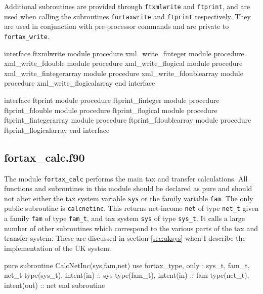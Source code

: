\documentclass[11pt,thmsa,letter,ukenglish]{article}
\begin{document}
\noindent Additional subroutines are provided through \texttt{ftxmlwrite} and \texttt{ftprint}, and are used when calling the subroutines \texttt{fortaxwrite} and \texttt{ftprint} respectively. They are used in conjunction with pre-processor commands and are private to \texttt{fortax\_write}.

\begin{fortrancode}
interface ftxmlwrite
    module procedure xml_write_finteger
    module procedure xml_write_fdouble
    module procedure xml_write_flogical
    module procedure xml_write_fintegerarray
    module procedure xml_write_fdoublearray
    module procedure xml_write_flogicalarray
end interface
\end{fortrancode}

\begin{fortrancode}
interface ftprint
    module procedure ftprint_finteger
    module procedure ftprint_fdouble
    module procedure ftprint_flogical
    module procedure ftprint_fintegerarray
    module procedure ftprint_fdoublearray
    module procedure ftprint_flogicalarray
end interface
\end{fortrancode}

\subsection{fortax\_calc.f90}\label{sec:fortaxcalc}

The module \texttt{fortax\_calc} performs the main tax and transfer calculations. All functions and subroutines in this module should be declared as pure and should not alter either the tax system variable \texttt{sys} or the family variable \texttt{fam}. The only public subroutine is \texttt{calcnetinc}. This returns net-income \texttt{net} of type \texttt{net\_t} given a family \texttt{fam} of type \texttt{fam\_t}, and tax system \texttt{sys} of type \texttt{sys\_t}. It calls a large number of other subroutines which correspond to the various parts of the tax and transfer system. These are discussed in section \ref{sec:uksys} when I describe the implementation of the UK system.

\begin{fortrancode}
pure subroutine CalcNetInc(sys,fam,net)
    use fortax_type, only : sys_t, fam_t, net_t
    type(sys_t), intent(in)  :: sys
    type(fam_t), intent(in)  :: fam
    type(net_t), intent(out) :: net
end subroutine
\end{fortrancode}
\end{document}

